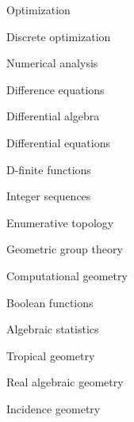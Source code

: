\item Optimization
\item Discrete optimization
\item Numerical analysis
\item Difference equations
\item Differential algebra
\item Differential equations
\item D-finite functions
\item Integer sequences
\item Enumerative topology
\item Geometric group theory
\item Computational geometry
\item Boolean functions
\item Algebraic statistics
\item Tropical geometry
\item Real algebraic geometry
\item Incidence geometry
